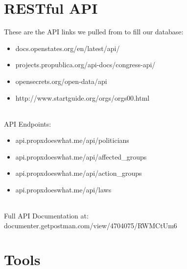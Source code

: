 \documentclass[12pt]{article}
\begin{document}
\section{RESTful API}
These are the API links we pulled from to fill our database: \\

\begin{itemize}[label=-]
	\item docs.openstates.org/en/latest/api/
	\item projects.propublica.org/api-docs/congress-api/
	\item opensecrets.org/open-data/api
	\item http://www.startguide.org/orgs/orgs00.html
\end{itemize}

~\\
API Endpoints: \\

\begin{itemize}[label=-]
	\item api.propxdoeswhat.me/api/politicians
	\item api.propxdoeswhat.me/api/affected\_groups
	\item api.propxdoeswhat.me/api/action\_groups
	\item api.propxdoeswhat.me/api/laws
\end{itemize}

~\\
Full API Documentation at:\\ documenter.getpostman.com/view/4704075/RWMCtUm6

\section{Tools}
\end{document}
